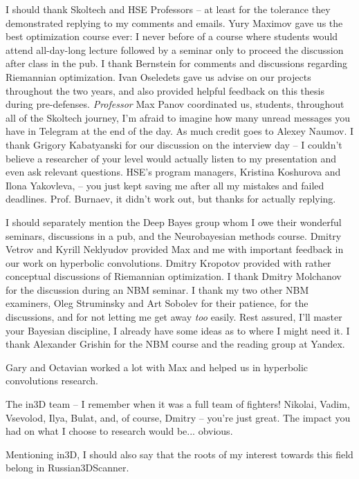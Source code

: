 I should thank Skoltech and HSE Professors -- at least for the tolerance they
demonstrated replying to my comments and emails. Yury Maximov gave us the best
optimization course ever: I never before of a course where students would
attend all-day-long lecture followed by a seminar only to proceed the
discussion after class in the pub. I thank Bernstein for comments and
discussions regarding Riemannian optimization. Ivan Oseledets gave us advise on
our projects throughout the two years, and also provided helpful feedback on
this thesis during pre-defenses. \emph{Professor} Max Panov coordinated
us, students, throughout all of the Skoltech journey, I'm afraid to imagine how
many unread messages you have in Telegram at the end of the day. As much credit
goes to Alexey Naumov.  I thank Grigory Kabatyanski for our discussion on the
interview day -- I couldn't believe a researcher of your level would actually
listen to my presentation and even ask relevant questions. HSE's program
managers, Kristina Koshurova and Ilona Yakovleva, -- you just kept saving me
after all my mistakes and failed deadlines. Prof. Burnaev, it didn't work out,
but thanks for actually replying.

I should separately mention the Deep Bayes group whom I owe their wonderful
seminars, discussions in a pub, and the Neurobayesian methods course. Dmitry Vetrov
and Kyrill Neklyudov provided Max and me with important feedback in our work on
hyperbolic convolutions. Dmitry Kropotov provided with rather conceptual
discussions of Riemannian optimization. I thank Dmitry Molchanov for the discussion
during an NBM seminar. I thank my two other NBM examiners, Oleg Struminsky and Art
Sobolev for their patience, for the discussions, and for not letting me get away
\emph{too} easily. Rest assured, I'll master your Bayesian discipline, I
already have some ideas as to where I might need it. I thank Alexander Grishin
for the NBM course and the reading group at Yandex.

Gary and Octavian worked a lot with Max and helped us in hyperbolic convolutions
research.

The in3D team -- I remember when it was a full team of fighters! Nikolai,
Vadim, Vsevolod, Ilya, Bulat, and, of course, Dmitry -- you're just great.
The impact you had on what I choose to research would be... obvious.

Mentioning in3D, I should also say that the roots of my interest towards this field
belong in Russian3DScanner.

